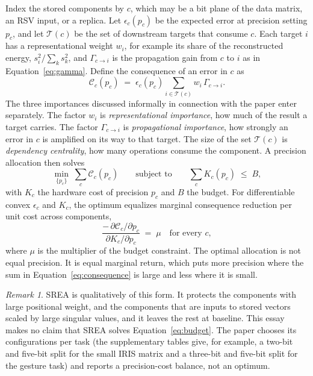 \documentclass[11pt]{article}
\theoremstyle{definition}
\theoremstyle{remark}
\newtheorem{remark}{Remark}
\begin{document}
Index the stored components by $c$, which may be a bit plane of the data matrix, an RSV input, or a replica. Let $\epsilon_c(p_c)$ be the expected error at precision setting $p_c$, and let $\mathcal{T}(c)$ be the set of downstream targets that consume $c$. Each target $i$ has a representational weight $w_i$, for example its share of the reconstructed energy, $s_i^2/\sum_k s_k^2$, and $\Gamma_{c\to i}$ is the propagation gain from $c$ to $i$ as in Equation~\eqref{eq:gamma}. Define the consequence of an error in $c$ as
\begin{equation}
  \mathcal{C}_c(p_c) \;=\; \epsilon_c(p_c)\sum_{i\in\mathcal{T}(c)} w_i\,\Gamma_{c\to i}.
  \label{eq:consequence}
\end{equation}
The three importances discussed informally in connection with the paper enter separately. The factor $w_i$ is \emph{representational importance}, how much of the result a target carries. The factor $\Gamma_{c\to i}$ is \emph{propagational importance}, how strongly an error in $c$ is amplified on its way to that target. The size of the set $\mathcal{T}(c)$ is \emph{dependency centrality}, how many operations consume the component. A precision allocation then solves
\begin{equation}
  \min_{\{p_c\}}\;\sum_c \mathcal{C}_c(p_c)
  \qquad\text{subject to}\qquad
  \sum_c K_c(p_c)\;\le\; B,
  \label{eq:budget}
\end{equation}
with $K_c$ the hardware cost of precision $p_c$ and $B$ the budget. For differentiable convex $\epsilon_c$ and $K_c$, the optimum equalizes marginal consequence reduction per unit cost across components,
\[
  \frac{-\,\partial\mathcal{C}_c/\partial p_c}{\partial K_c/\partial p_c} \;=\; \mu \quad\text{for every }c,
\]
where $\mu$ is the multiplier of the budget constraint. The optimal allocation is not equal precision. It is equal marginal return, which puts more precision where the sum in Equation~\eqref{eq:consequence} is large and less where it is small.

\begin{remark}
SREA is qualitatively of this form. It protects the components with large positional weight, and the components that are inputs to stored vectors scaled by large singular values, and it leaves the rest at baseline. This essay makes no claim that SREA solves Equation~\eqref{eq:budget}. The paper chooses its configurations per task (the supplementary tables give, for example, a two-bit and five-bit split for the small IRIS matrix and a three-bit and five-bit split for the gesture task) and reports a precision-cost balance, not an optimum.
\end{remark}
\end{document}
